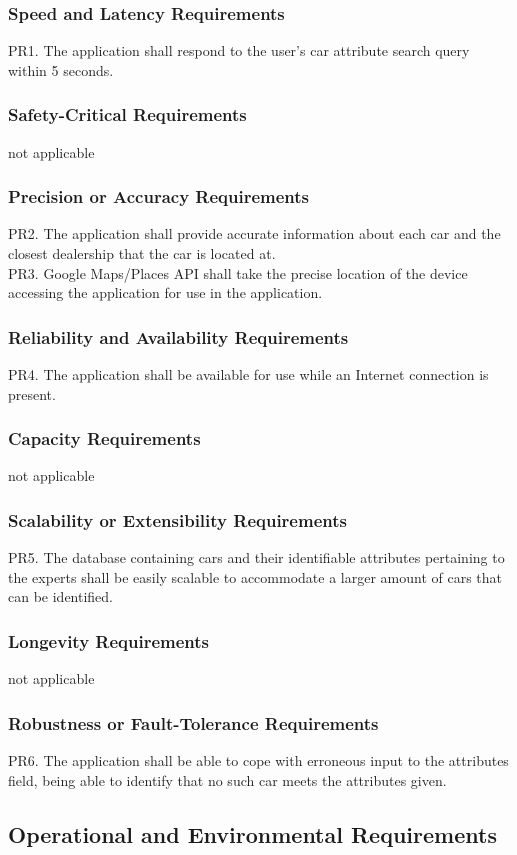\documentclass[12pt]{article}
\begin{document}
\subsubsection{Speed and Latency Requirements}
PR1. The application shall respond to the user’s car attribute search query within 5 seconds.
\subsubsection{Safety-Critical Requirements}
not applicable
\subsubsection{Precision or Accuracy Requirements}
PR2. The application shall provide accurate information about each car and the closest dealership that the car is located at.\\
PR3. Google Maps/Places API shall take the precise location of the device accessing the application for use in the application.
\subsubsection{Reliability and Availability Requirements}
PR4. The application shall be available for use while an Internet connection is present.
\subsubsection{Capacity Requirements}
not applicable
\subsubsection{Scalability or Extensibility Requirements}
PR5. The database containing cars and their identifiable attributes pertaining to the experts shall be easily scalable to accommodate a larger amount of cars that can be identified.
\subsubsection{Longevity Requirements}
not applicable
\subsubsection{Robustness or Fault-Tolerance Requirements}
PR6. The application shall be able to cope with erroneous input to the attributes field, being able to identify that no such car meets the attributes given.
\subsection{Operational and Environmental Requirements}
\end{document}
